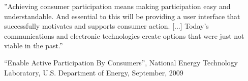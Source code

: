 ''Achieving consumer participation means making participation easy and understandable.  And essential to this will be providing a user interface that successfully motivates and supports consumer action. [...] Today's communications and electronic technologies create options that were just not viable in the past.''

``Enable Active Participation By Consumers'', National Energy Technology Laboratory, U.S. Department of Energy, September, 2009
